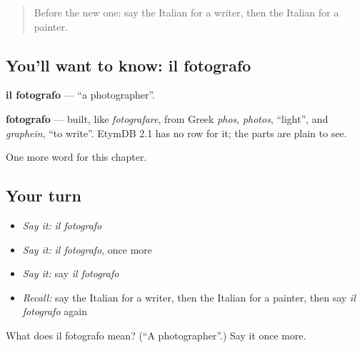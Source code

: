 \begin{quote}
Before the new one: say the Italian for a writer, then the Italian for a painter.
\end{quote}

\subsection*{You'll want to know: il fotografo}
\textbf{il fotografo} — \textquotedblleft{}a photographer\textquotedblright{}.

\begin{cousinweb}
\textbf{fotografo} — built, like \emph{fotografare}, from Greek \emph{phos}, \emph{photos}, \textquotedblleft{}light\textquotedblright{}, and \emph{graphein}, \textquotedblleft{}to write\textquotedblright{}. EtymDB 2.1 has no row for it; the parts are plain to see.
\end{cousinweb}

\begin{grammarlens}[title={What you've built}]
One more word for this chapter.
\end{grammarlens}

\subsection*{Your turn}
\begin{itemize}
\raggedright
  \item \emph{Say it:} \emph{il fotografo}
  \item \emph{Say it:} \emph{il fotografo}, once more
  \item \emph{Say it:} say \emph{il fotografo}
  \item \emph{Recall:} say the Italian for a writer, then the Italian for a painter, then say \emph{il fotografo} again
\end{itemize}

\begin{tcolorbox}[breakable,colback=teal!4,colframe=teal!35!black,title={Before you move on}]
What does il fotografo mean? (\textquotedblleft{}A photographer\textquotedblright{}.) Say it once more.
\end{tcolorbox}
